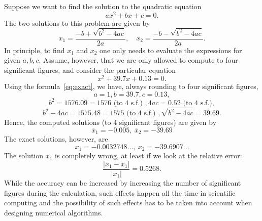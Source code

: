 \documentclass[11pt,a4paper]{memoir}
\begin{document}
\begin{example}
Suppose we want to find the solution to the quadratic equation 
\begin{equation*}
ax^2+bx+c=0.
\end{equation*}
The two solutions to this problem are given by
\begin{equation}\label{eq:exact}
  x_1 = \frac{-b+\sqrt{b^2-4ac}}{2a}, \quad x_2 = \frac{-b-\sqrt{b^2-4ac}}{2a}.
\end{equation}
In principle, to find $x_1$ and $x_2$ one only needs to evaluate the expressions for given $a,b,c$. 
Assume, however, that we are only allowed to compute to four significant figures, and 
consider the particular equation
\begin{equation*}
  x^2+39.7x+0.13 = 0.
\end{equation*}
Using the formula~\ref{eq:exact}, we have, always rounding to four significant figures,
\begin{equation*}
 a=1, b=39.7, c=0.13,
\end{equation*}
\begin{equation*}
b^2 = 1576.09 = 1576 \text{ (to 4 s.f.) }, 4ac = 0.52 \text{ (to 4 s.f.)},
\end{equation*}
\begin{equation*}
b^2-4ac = 1575.48 = 1575 \text{ (to 4 s.f.) }, \sqrt{b^2-4ac} = 39.69.
\end{equation*}
Hence, the computed solutions (to 4 significant figures) are given by
\begin{equation*}
  \overline{x}_1 = -0.005, \ \overline{x}_{2}=-39.69
\end{equation*}
The exact solutions, however, are
\begin{equation*}
  x_1 = -0.0032748..., \ x_{2}=-39.6907...
\end{equation*}
The solution $x_1$ is completely wrong, at least if we look at the relative error:
\begin{equation*}
  \frac{|\overline{x}_1-x_1|}{|x_1|} = 0.5268.
\end{equation*}
While the accuracy can be increased by increasing the number of significant figures during the calculation, such effects happen all the time in 
scientific computing and the possibility of such effects has to be taken into account when designing numerical algorithms.


\end{example}
\end{document}
